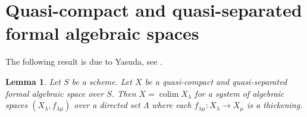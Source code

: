 \documentclass{stacks-project}
\newenvironment{reference}{\comment}{\endcomment}
\theoremstyle{plain}
\newtheorem{lemma}[subsection]{Lemma}
\theoremstyle{definition}
\theoremstyle{remark}
\numberwithin{equation}{subsection}
\def\colim{\mathop{\mathrm{colim}}\nolimits}
\begin{document}
\section{Quasi-compact and quasi-separated formal algebraic spaces}
\label{section-quasi-compact-quasi-separated}

\noindent
The following result is due to Yasuda, see
\cite[Proposition 3.32]{Yasuda}.

\begin{lemma}
\label{lemma-structure-quasi-compact-quasi-separated}
\begin{reference}
\cite[Proposition 3.32]{Yasuda}
\end{reference}
Let $S$ be a scheme. Let $X$ be a quasi-compact and quasi-separated
formal algebraic space over $S$. Then $X = \colim X_\lambda$
for a system of algebraic spaces $(X_\lambda, f_{\lambda \mu})$
over a directed set $\Lambda$ where each
$f_{\lambda \mu} : X_\lambda \to X_\mu$ is a thickening.
\end{lemma}
\end{document}

